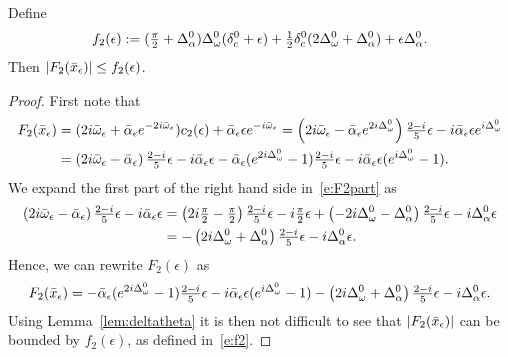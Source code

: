 \begin{proposition}
		\label{prop:YfBound2}
	Define 
		\begin{equation}\label{e:f2}
		f_2(\epsilon) :=		(\tfrac{\pi}{2} + \Delta_\alpha^0) \Delta_\omega^0 ( \delta_c^0 + \epsilon  ) +   \tfrac{1}{2}\delta_c^0 ( 2 \Delta_\omega^0 + \Delta_\alpha^0 ) + \epsilon \Delta_\alpha^0.
		\end{equation}
	Then $| F_2(\bar{x}_\epsilon) | \leq f_2(\epsilon)$. 
\end{proposition}
%
\begin{proof}
	First note that 
\begin{alignat}{1}
	F_2(\bar{x}_\epsilon) &= 
	( 2 i \bar{\omega}_\epsilon + \bar{\alpha}_\epsilon e^{- 2 i \bar{\omega}_\epsilon}) c_2( \epsilon)+ 
	\bar{\alpha}_\epsilon \epsilon  e^{ -i \bar{\omega}_\epsilon} 
= \left(  2 i \bar{\omega}_\epsilon - \bar{\alpha}_\epsilon e^{ 2 i \dw^0 } \right) \tfrac{2-i}{5} \epsilon - i	\bar{\alpha}_\epsilon \epsilon  e^{ i \dw^0 }   \nonumber \\
%
		&=  \left(  2 i \bar{\omega}_\epsilon - \bar{\alpha}_\epsilon  \right) \tfrac{2-i}{5} \epsilon - i	\bar{\alpha}_\epsilon \epsilon   
   - \bar{\alpha}_\epsilon (e^{ 2 i \dw^0 } -1)  \tfrac{2-i}{5} \epsilon -i	\bar{\alpha}_\epsilon \epsilon  (e^{ i \dw^0 }-1).
\label{e:F2part}
\end{alignat}
We expand the first part of the right hand side in~\eqref{e:F2part} as
	\begin{alignat*}{1}
 \left(  2 i \bar{\omega}_\epsilon - \bar{\alpha}_\epsilon  \right) \tfrac{2-i}{5} \epsilon - i	\bar{\alpha}_\epsilon \epsilon  &= \left( 2 i \tfrac{\pi}{2} - \tfrac{\pi}{2} \right) \tfrac{2-i}{5} \epsilon - i \tfrac{\pi}{2} \epsilon 
 +  \left(  - 2 i \Delta_\omega^0 - \Delta_\alpha^0 \right) \tfrac{2-i}{5} \epsilon -	i \Delta_\alpha^0  \epsilon
 \\
& = - \left(   2 i \Delta_\omega^0 + \Delta_\alpha^0 \right) \tfrac{2-i}{5} \epsilon -	i \Delta_\alpha^0  \epsilon .
\end{alignat*}
Hence, we can rewrite $F_2(\epsilon)$ as 
	\begin{equation*}
F_2(\bar{x}_\epsilon) =   - \bar{\alpha}_\epsilon (e^{ 2 i \Delta_\omega^0 } -1)  \tfrac{2-i}{5} \epsilon -i	\bar{\alpha}_\epsilon \epsilon  (e^{ i \Delta_\omega^0 }-1)
 -\left(   2 i \Delta_\omega^0 + \Delta_\alpha^0 \right) \tfrac{2-i}{5} \epsilon -	i \Delta_\alpha^0  \epsilon .
	\end{equation*}
Using Lemma~\ref{lem:deltatheta} it  is then not difficult to see that $|F_2(\bar{x}_\epsilon)|$ can be bounded by $f_2(\epsilon)$, as defined in~\eqref{e:f2}.
\end{proof}


